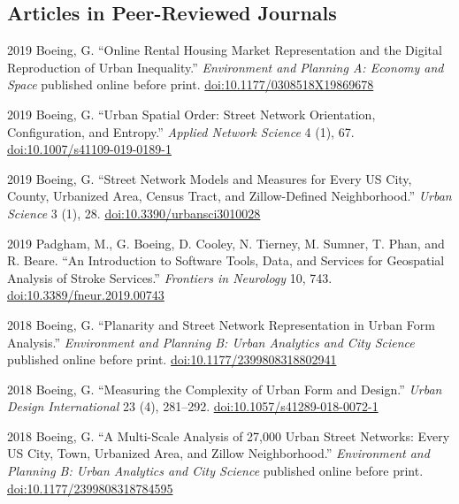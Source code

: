 \documentclass[12pt,letterpaper]{report}
\begin{document}
    \subsection*{Articles in Peer-Reviewed Journals}

    \begin{tablist}
    	
    	\item[2019] \tab Boeing, G. \enquote{Online Rental Housing Market Representation and the Digital Reproduction of Urban Inequality.} \textit{Environment and Planning A: Economy and Space} published online before print. \href{https://doi.org/10.1177/0308518X19869678}{doi:10.1177/0308518X19869678}
    	
    	\item[2019] \tab Boeing, G. \enquote{Urban Spatial Order: Street Network Orientation, Configuration, and Entropy.} \textit{Applied Network Science} 4 (1), 67. \href{https://doi.org/10.1007/s41109-019-0189-1}{doi:10.1007/s41109-019-0189-1}
		
        \item[2019] \tab Boeing, G. \enquote{Street Network Models and Measures for Every US City, County, Urbanized Area, Census Tract, and Zillow-Defined Neighborhood.} \textit{Urban Science} 3 (1), 28. \href{https://doi.org/10.3390/urbansci3010028}{doi:10.3390/urbansci3010028}
        
        \item[2019] \tab Padgham, M., G. Boeing, D. Cooley, N. Tierney, M. Sumner, T. Phan, and R. Beare. \enquote{An Introduction to Software Tools, Data, and Services for Geospatial Analysis of Stroke Services.} \textit{Frontiers in Neurology} 10, 743. \href{https://doi.org/10.3389/fneur.2019.00743}{doi:10.3389/fneur.2019.00743}

        \item[2018] \tab Boeing, G. \enquote{Planarity and Street Network Representation in Urban Form Analysis.} \textit{Environment and Planning B: Urban Analytics and City Science} published online before print. \href{https://doi.org/10.1177/2399808318802941}{doi:10.1177/2399808318802941}

        \item[2018] \tab Boeing, G. \enquote{Measuring the Complexity of Urban Form and Design.} \textit{Urban Design International} 23 (4), 281--292. \href{https://doi.org/10.1057/s41289-018-0072-1}{doi:10.1057/s41289-018-0072-1}

        \item[2018] \tab Boeing, G. \enquote{A Multi-Scale Analysis of 27,000 Urban Street Networks: Every US City, Town, Urbanized Area, and Zillow Neighborhood.} \textit{Environment and Planning B: Urban Analytics and City Science} published online before print. \href{https://doi.org/10.1177/2399808318784595}{doi:10.1177/2399808318784595}


\end{tablist}
\end{document}
